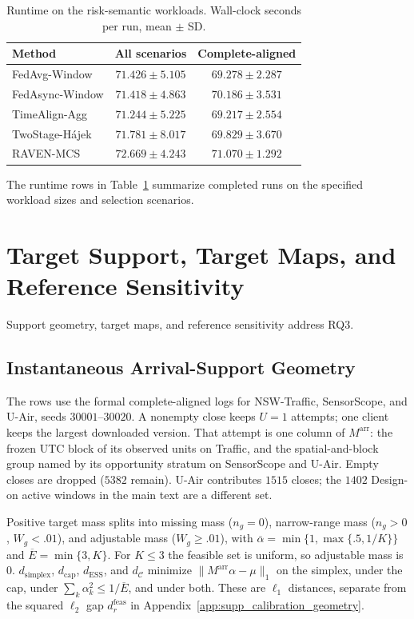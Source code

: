 \begin{table}[!t]
\centering
\caption{Runtime on the risk-semantic workloads.
Wall-clock seconds per run, mean $\pm$ SD.}
\label{tab:app_runtime}
\footnotesize
\setlength{\tabcolsep}{3.5pt}
\begin{tabular*}{\columnwidth}{@{\extracolsep{\fill}}lcc}
\toprule
Method & All scenarios & Complete-aligned\\
\midrule
FedAvg-Window & $71.426\pm5.105$ & $69.278\pm2.287$ \\
FedAsync-Window & $71.418\pm4.863$ & $70.186\pm3.531$ \\
TimeAlign-Agg & $71.244\pm5.225$ & $69.217\pm2.554$ \\
TwoStage-H\'ajek & $71.781\pm8.017$ & $69.829\pm3.670$ \\
RAVEN-MCS & $72.669\pm4.243$ & $71.070\pm1.292$ \\
\bottomrule
\end{tabular*}
\end{table}

The runtime rows in Table~\ref{tab:app_runtime} summarize completed runs on the
specified workload sizes and selection scenarios.

\section{Target Support, Target Maps, and Reference Sensitivity}
Support geometry, target maps, and reference sensitivity address RQ3.

\subsection{Instantaneous Arrival-Support Geometry}

The rows use the formal complete-aligned logs for NSW-Traffic, SensorScope,
and U-Air, seeds $30001$--$30020$. A nonempty close keeps $U=1$ attempts;
one client keeps the largest downloaded version. That attempt is one column
of $M^{\mathrm{arr}}$: the frozen UTC block of its observed units on Traffic,
and the spatial-and-block group named by its opportunity stratum on
SensorScope and U-Air. Empty closes are dropped ($5382$ remain). U-Air
contributes $1515$ closes; the $1402$ Design-on active windows in the main
text are a different set.

Positive target mass splits into missing mass ($n_g=0$), narrow-range mass
($n_g>0$, $W_g<.01$), and adjustable mass ($W_g\ge.01$), with
$\overline\alpha=\min\{1,\max\{.5,1/K\}\}$ and $\overline E=\min\{3,K\}$.
For $K\le 3$ the feasible set is uniform, so adjustable mass is $0$.
$d_{\mathrm{simplex}}$, $d_{\mathrm{cap}}$, $d_{\mathrm{ESS}}$, and
$d_{\mathcal C}$ minimize $\|M^{\mathrm{arr}}\alpha-\mu\|_1$ on the simplex,
under the cap, under $\sum_k\alpha_k^2\le 1/\overline E$, and under both.
These are $\ell_1$ distances, separate from the squared $\ell_2$ gap
$d_r^{\mathrm{feas}}$ in Appendix~\ref{app:supp_calibration_geometry}.

